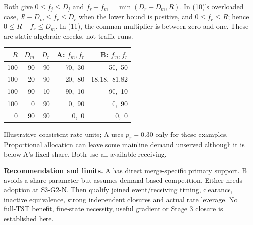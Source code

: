 \documentclass[11pt,a4paper]{article}
\begin{document}
Both give $0\le f_j\le D_j$ and
$f_r+f_m=\min(D_r+D_m,R)$. In (10)'s overloaded case,
$R-D_m\le f_r\le D_r$ when the lower bound is positive, and
$0\le f_r\le R$; hence $0\le R-f_r\le D_m$. In (11), the common multiplier
is between zero and one. These are static algebraic checks, not traffic runs.

\begin{center}
\begin{tabular}{rrrrr}
\toprule
$R$ & $D_m$ & $D_r$ & A: $f_m,f_r$ & B: $f_m,f_r$\\
\midrule
100 & 90 & 90 & 70,\ 30 & 50,\ 50\\
100 & 20 & 90 & 20,\ 80 & 18.18,\ 81.82\\
100 & 90 & 10 & 90,\ 10 & 90,\ 10\\
100 & 0 & 90 & 0,\ 90 & 0,\ 90\\
0 & 90 & 90 & 0,\ 0 & 0,\ 0\\
\bottomrule
\end{tabular}
\end{center}
Illustrative consistent rate units; A uses $p_r=0.30$ only for these examples.
Proportional allocation can leave some mainline demand unserved although it
is below A's fixed share. Both use all available receiving.

\textbf{Recommendation and limits.} A has direct merge-specific primary support.
B avoids a share parameter but assumes demand-based competition. Either needs
adoption at S3-G2-N. Then qualify joined event/receiving timing, clearance,
inactive equivalence, strong independent closures and actual rate leverage.
No full-TST benefit, fine-state necessity, useful gradient or Stage 3 closure
is established here.
\end{document}
